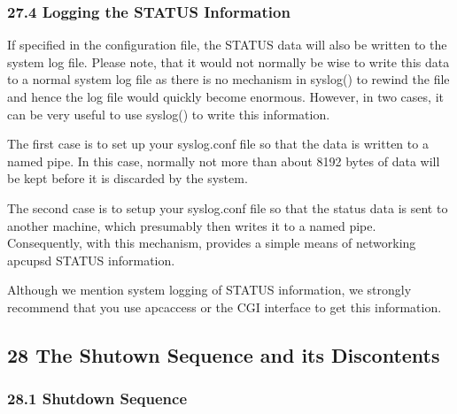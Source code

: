 \label{Logging-the-STATUS-Information}

\subsubsection*{27.4 Logging the STATUS Information}

\label{index-Logging-Status-257}
\label{index-Status_002c-Logging-258}
If specified in the configuration file, the STATUS data will also be written
to the system log file. Please note, that it would not normally be wise to
write this data to a normal system log file as there is no mechanism in
syslog() to rewind the file and hence the log file would quickly become
enormous. However, in two cases, it can be very useful to use syslog() to
write this information.  

The first case is to set up your syslog.conf file so that the data is written
to a named pipe. In this case, normally not more than about 8192 bytes of data
will be kept before it is discarded by the system.  

The second case is to setup your syslog.conf file so that the status data is
sent to another machine, which presumably then writes it to a named pipe.
Consequently, with this mechanism, provides a simple means of networking
apcupsd STATUS information.  

Although we mention system logging of STATUS information, we strongly
recommend that you use apcaccess or the CGI interface to get this information.


\label{The-Shutown-Sequence-and-its-Discontents}

\subsection*{28 The Shutown Sequence and its Discontents}

\label{index-Shutdown-Sequence-259}

\label{Shutdown-Sequence-_003c1_003e}

\subsubsection*{28.1 Shutdown Sequence}

